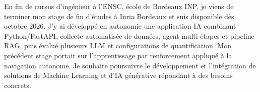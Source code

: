 
\begin{cvparagraph}
En fin de cursus d’ingénieur à l’ENSC, école de Bordeaux INP, je viens de terminer mon stage de fin d’études à Inria Bordeaux et suis disponible dès octobre 2026. J’y ai développé en autonomie une application IA combinant Python/FastAPI, collecte automatisée de données, agent multi-étapes et pipeline RAG, puis évalué plusieurs LLM et configurations de quantification. Mon précédent stage portait sur l’apprentissage par renforcement appliqué à la navigation autonome. Je souhaite poursuivre le développement et l’intégration de solutions de Machine Learning et d’IA générative répondant à des besoins concrets.
\end{cvparagraph}
